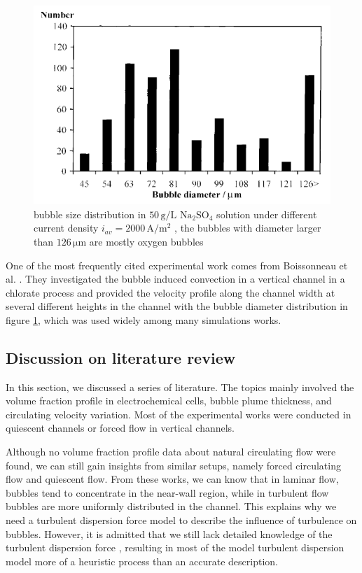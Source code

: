 \begin{figure}
    \centering
    \includegraphics[scale = 0.6]{bubblesizedistribution.png}
    \caption{bubble size distribution in $ 50 \, \mathrm{g/L} $ $ \mathrm{Na_2 SO_4} $ solution under different current density $i_{av} = 2000 \, \mathrm{A/m^2}$ \cite{Boissonneau2000}, the bubbles with diameter larger than $126 \, \mathrm{μ m}$ are mostly oxygen bubbles}
    \label{bubblesize}
\end{figure}

One of the most frequently cited experimental work comes from Boissonneau et al. \cite{Boissonneau2000}. They investigated the bubble induced convection in a vertical channel in a chlorate process and provided the velocity profile along the channel width at several different heights in the channel with the bubble diameter distribution in figure \ref{bubblesize}, which was used widely among many simulations works.

\subsection{Discussion on literature review}

In this section, we discussed a series of literature. The topics mainly involved the volume fraction profile in electrochemical cells, bubble plume thickness, and circulating velocity variation. Most of the experimental works were conducted in quiescent channels or forced flow in vertical channels. 

Although no volume fraction profile data about natural circulating flow were found, we can still gain insights from similar setups, namely forced circulating flow and quiescent flow. From these works, we can know that in laminar flow, bubbles tend to concentrate in the near-wall region, while in turbulent flow bubbles are more uniformly distributed in the channel. This explains why we need a turbulent dispersion force model to describe the influence of turbulence on bubbles. However, it is admitted that we still lack detailed knowledge of the turbulent dispersion force \cite{Rzehak2013}, resulting in most of the model turbulent dispersion model more of a heuristic process than an accurate description.